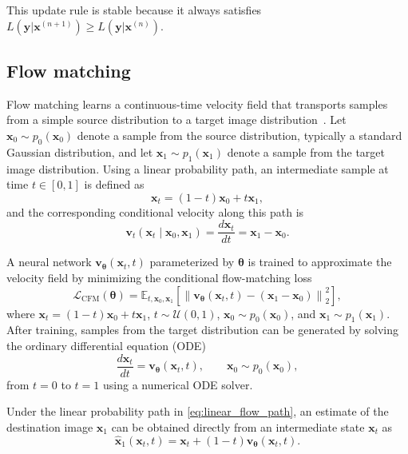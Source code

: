\documentclass[journal]{IEEEtran}
\begin{document}
This update rule is stable because it always satisfies $L(\bm y|\bm x^{(n+1)}) \geq L(\bm y|\bm x^{(n)})$.

\subsection{Flow matching}
Flow matching learns a continuous-time velocity field that transports samples from a simple source distribution to a target image distribution~\cite{Lipman2023,liu2023}. Let $\bm{x}_0\sim p_0(\bm{x}_0)$ denote a sample from the source distribution, typically a standard Gaussian distribution, and let $\bm{x}_1\sim p_1(\bm{x}_1)$ denote a sample from the target image distribution. Using a linear probability path, an intermediate sample at time $t\in[0,1]$ is defined as
\begin{equation}
\bm{x}_t = (1-t)\bm{x}_0+t\bm{x}_1,
\label{eq:linear_flow_path}
\end{equation}
and the corresponding conditional velocity along this path is
\begin{equation}
\bm{v}_t(\bm{x}_t\mid\bm{x}_0,\bm{x}_1) = \frac{d\bm{x}_t}{dt} = \bm{x}_1-\bm{x}_0.
\label{eq:conditional_velocity}
\end{equation}

A neural network $\bm{v}_{\bm{\theta}}(\bm{x}_t,t)$ parameterized by $\bm{\theta}$ is trained to approximate the velocity field by minimizing the conditional flow-matching loss
\begin{equation}
\mathcal{L}_{\mathrm{CFM}}(\bm{\theta}) = \mathbb{E}_{t,\bm{x}_0,\bm{x}_1} \left[ \left\| \bm{v}_{\bm{\theta}}(\bm{x}_t,t)
- (\bm{x}_1-\bm{x}_0) \right\|_2^2 \right],
\label{eq:flow_matching_loss}
\end{equation}
where $\bm{x}_t = (1-t)\bm{x}_0+t\bm{x}_1$, $t\sim\mathcal{U}(0,1)$,
$\bm{x}_0\sim p_0(\bm{x}_0)$, and $\bm{x}_1\sim p_1(\bm{x}_1)$. After training, samples from the target distribution can be generated by solving the ordinary differential equation (ODE)
\begin{equation}
\frac{d\bm{x}_t}{dt} = \bm{v}_{\bm{\theta}}(\bm{x}_t,t),
\qquad \bm{x}_0\sim p_0(\bm{x}_0),
\label{eq:flow_ode}
\end{equation}
from $t=0$ to $t=1$ using a numerical ODE solver.

Under the linear probability path in \eqref{eq:linear_flow_path}, an estimate of the destination image $\bm{x}_1$ can be obtained directly from an intermediate state $\bm{x}_t$ as
\begin{equation}
\hat{\bm{x}}_1(\bm{x}_t,t) = \bm{x}_t + (1-t)\bm{v}_{\bm{\theta}}(\bm{x}_t,t).
\label{eq:destination_estimate}
\end{equation}
\end{document}
